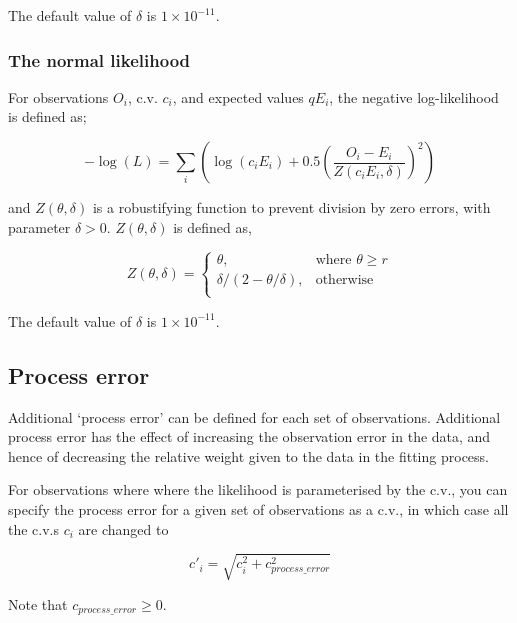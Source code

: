 The default value of $\delta$ is $1 \times 10^{-11}$.

\subsubsection*{The normal likelihood}

For observations $O_i$, c.v. $c_i$, and expected values $qE_i$, the negative log-likelihood is defined as;

\begin{equation}
 - \log \left(L \right) = \sum\limits_i \left( \log \left( c_i E_i \right) +0.5 \left( \frac{O_i-E_i}{Z\left(c_i E_i,\delta \right)}\right)^2\right)
\end{equation}

and $Z \left(\theta,\delta \right)$ is a robustifying function to prevent division by zero errors, with parameter $\delta>0$. $Z \left(\theta,\delta \right)$ is defined as,

\begin{equation}
   Z \left(\theta,\delta \right) = \begin{cases}
	  \theta, & \text{where $\theta \ge r$} \\
	  \delta/\left( 2-\theta/\delta \right), & \text{otherwise} \\  
  \end{cases}
\end{equation}

The default value of $\delta$ is $1 \times 10^{-11}$.

\subsection{Process error}

Additional `process error' can be defined for each set of observations. Additional process error has the effect of increasing the observation error in the data, and hence of decreasing the relative weight given to the data in the fitting process. 

For observations where where the likelihood is parameterised by the c.v., you can specify the process error for a given set of observations as a c.v., in which case all the c.v.s $c_i$ are changed to

\begin{equation}
  c'_i  = \sqrt {c_i^2  + c_{process\_error}^2 } 
\end{equation}

Note that $c_{process\_ error} \ge 0$.

